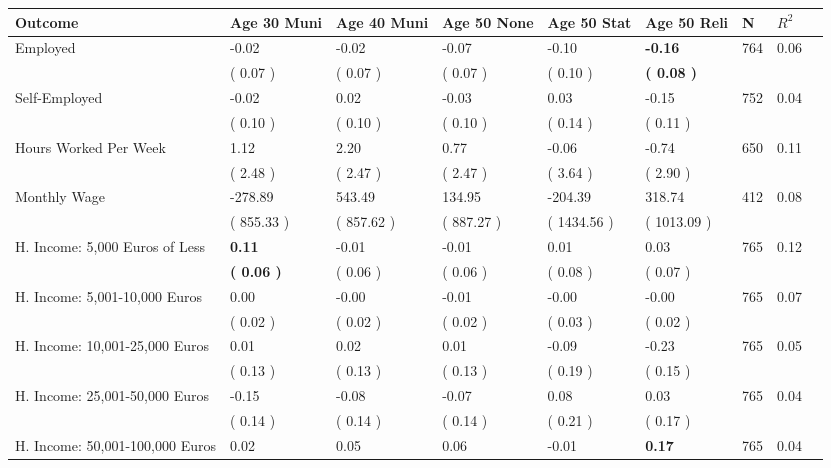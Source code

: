 \begin{tabular}{L{6.2cm} C{1.8cm} C{1.8cm} C{1.8cm} C{1.8cm} C{1.8cm} C{1.8cm} C{0.3cm} C{0.3cm}}
\toprule
 \textbf{Outcome} & \textbf{Age 30 Muni} & \textbf{Age 40 Muni} & \textbf{Age 50 None} & \textbf{Age 50 Stat} & \textbf{Age 50 Reli} & \textbf{N} & \textbf{$ R^2$} \\
\midrule
Employed &     -0.02 &     -0.02 &     -0.07 &     -0.10 & \textbf{    -0.16}  & 764 &       0.06 \\ 
 & (     0.07 ) & (     0.07 ) & (     0.07 ) & (     0.10 ) & \textbf{(     0.08 )}  & \\
Self-Employed &     -0.02 &      0.02 &     -0.03 &      0.03 &     -0.15  & 752 &       0.04 \\ 
 & (     0.10 ) & (     0.10 ) & (     0.10 ) & (     0.14 ) & (     0.11 )  & \\
Hours Worked Per Week &      1.12 &      2.20 &      0.77 &     -0.06 &     -0.74  & 650 &       0.11 \\ 
 & (     2.48 ) & (     2.47 ) & (     2.47 ) & (     3.64 ) & (     2.90 )  & \\
Monthly Wage &   -278.89 &    543.49 &    134.95 &   -204.39 &    318.74  & 412 &       0.08 \\ 
 & (   855.33 ) & (   857.62 ) & (   887.27 ) & (  1434.56 ) & (  1013.09 )  & \\
H. Income: 5,000 Euros of Less & \textbf{     0.11} &     -0.01 &     -0.01 &      0.01 &      0.03  & 765 &       0.12 \\ 
 & \textbf{(     0.06 )} & (     0.06 ) & (     0.06 ) & (     0.08 ) & (     0.07 )  & \\
H. Income: 5,001-10,000 Euros &      0.00 &     -0.00 &     -0.01 &     -0.00 &     -0.00  & 765 &       0.07 \\ 
 & (     0.02 ) & (     0.02 ) & (     0.02 ) & (     0.03 ) & (     0.02 )  & \\
H. Income: 10,001-25,000 Euros &      0.01 &      0.02 &      0.01 &     -0.09 &     -0.23  & 765 &       0.05 \\ 
 & (     0.13 ) & (     0.13 ) & (     0.13 ) & (     0.19 ) & (     0.15 )  & \\
H. Income: 25,001-50,000 Euros &     -0.15 &     -0.08 &     -0.07 &      0.08 &      0.03  & 765 &       0.04 \\ 
 & (     0.14 ) & (     0.14 ) & (     0.14 ) & (     0.21 ) & (     0.17 )  & \\
H. Income: 50,001-100,000 Euros &      0.02 &      0.05 &      0.06 &     -0.01 & \textbf{     0.17}  & 765 &       0.04 \\ 

\end{tabular}
